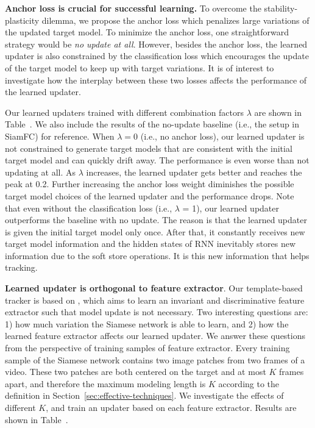 \documentclass[journal]{IEEEtran}
\begin{document}
\textbf{Anchor loss is crucial for successful learning.} To overcome the stability-plasticity dilemma, we propose the anchor loss which penalizes large variations of the updated target model. To minimize the anchor loss, one straightforward strategy would be \emph{no update at all}. However, besides the anchor loss, the learned updater is also constrained by the classification loss which encourages the update of the target model to keep up with target variations. It is of interest to investigate how the interplay between these two losses affects the performance of the learned updater.

Our learned updaters trained with different combination factors $\lambda$ are shown in Table~. We also include the results of the no-update baseline (i.e., the setup in SiamFC\cite{bertinetto2016fully}) for reference. When $\lambda = 0$ (i.e., no anchor loss), our learned updater is not constrained to generate target models that are consistent with the initial target model and can quickly drift away. The performance is even worse than not updating at all. As $\lambda$ increases, the learned updater gets better and reaches the peak at 0.2. Further increasing the anchor loss weight diminishes the possible target model choices of the learned updater and the performance drops. Note that even without the classification loss (i.e., $\lambda$ = 1), our learned updater outperforms the baseline with no update. The reason is that the learned updater is given the initial target model only once. After that, it constantly receives new target model information and the hidden states of RNN inevitably stores new information due to the soft store operations. It is this new information that helps tracking.

\textbf{Learned updater is orthogonal to feature extractor}. Our template-based tracker is based on \cite{bertinetto2016fully}, which aims to learn an invariant and discriminative feature extractor such that model update is not necessary. Two interesting questions are: 1) how much variation the Siamese network is able to learn, and 2) how the learned feature extractor affects our learned updater. We answer these questions from the perspective of training samples of feature extractor. Every training sample of the Siamese network contains two image patches from two frames of a video. These two patches are both centered on the target and at most $K$ frames apart, and therefore the maximum modeling length is $K$ according to the definition in Section~\ref{sec:effective-techniques}. We investigate the effects of different $K$, and train an updater based on each feature extractor. Results are shown in Table~.     
\end{document}
